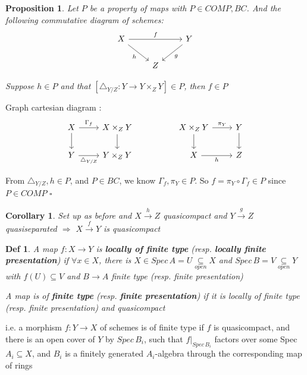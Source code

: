 \documentclass{article}
\newtheorem{definition}[theorem]{Def}
\newtheorem{corollary}[theorem]{Corollary}
\newtheorem{proposition}[theorem]{Proposition}
\newenvironment{Proof}{{\noindent \indent \it Proof:\quad}}{\hfill $\square$\par}
\begin{document}
\begin{proposition}
Let $P$ be a property of maps with $P\in COMP, BC$. And the following commutative diagram of schemes:
    \[\begin{tikzcd}
	X && Y \\
	& Z
	\arrow["h"', from=1-1, to=2-2]
	\arrow["g", from=1-3, to=2-2]
	\arrow["f", from=1-1, to=1-3]
\end{tikzcd}\]

Suppose $h\in P$ and that $[\triangle_{Y/Z}:Y\to Y\times_Z Y]\in P$, then $f\in P$
\label{prop 3.131}
\end{proposition}
\begin{Proof}
    Graph cartesian diagram :
\[\begin{tikzcd}
	X & {X\times_ZY} && {X\times_ZY} & Y \\
	Y & {Y\times_ZY} && X & Z
	\arrow[from=1-1, to=2-1]
	\arrow["{\triangle_{Y/Z}}"', from=2-1, to=2-2]
	\arrow[from=1-2, to=2-2]
	\arrow["{\Gamma_f}", from=1-1, to=1-2]
	\arrow["{\pi_Y}", from=1-4, to=1-5]
	\arrow[from=1-4, to=2-4]
	\arrow["{h}"', from=2-4, to=2-5]
	\arrow[from=1-5, to=2-5]
\end{tikzcd}\]

From $\triangle_{Y/Z},h\in P$, and $P\in BC$, we know $\Gamma_f,\pi_Y\in P$. So $f=\pi_Y\circ \Gamma_f\in P$ since $P\in COMP$
\end{Proof}

\begin{corollary}
    Set up as before and $X \xrightarrow{h} Z$ quasicompact and $Y \xrightarrow{g} Z$ quasiseparated $\Rightarrow$ $X\xrightarrow{f} Y$ is quasicompact
\end{corollary}

\begin{definition}
    A map $f:X\to Y$ is \textbf{locally of finite type} (resp. \textbf{locally finite presentation}) if $\forall x\in X$, there is $X\in Spec\,A=U\mathop{\subseteq}\limits_{open} X $ and $Spec\,B=V\mathop{\subseteq}\limits_{open} Y$ with $f(U)\subseteq V$ and $B\to A$ finite type (resp. finite presentation)

    A map is of \textbf{finite type} (resp. \textbf{finite presentation})
    if it is locally of finite type (resp. finite presentation) and quasicompact
\end{definition}

i.e. a morphism $f : Y \to X$ of schemes is of finite type if $f$ is quasicompact, and
there is an open cover of $Y$ by $Spec\, B_i$, such that $f|_{Spec\,B_i}$
factors over some Spec $A_i \subseteq X$, and $B_i$ is a
finitely generated $A_i$-algebra through the corresponding map of rings
\end{document}
